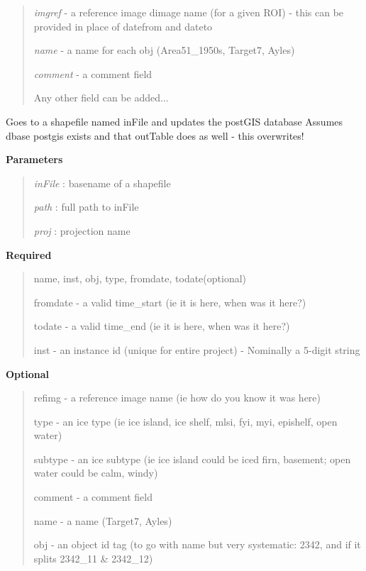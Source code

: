\documentclass[letterpaper,10pt,openany,oneside]{sphinxmanual}
\begin{document}
\begin{fulllineitems}
\begin{fulllineitems}
\begin{quote}
\emph{imgref}   - a reference image dimage name (for a given ROI) - this can be provided in place of datefrom and dateto

\emph{name}     - a name for each obj (Area51\_1950s, Target7, Ayles)

\emph{comment}  - a comment field

Any other field can be added...
\end{quote}

\end{fulllineitems}


\begin{fulllineitems}
\label{code:Database.Database.update_NTAI_FLUX_ROI}
Goes to a shapefile named inFile and updates the postGIS database
Assumes dbase postgis exists and that outTable does as well - this overwrites!

\textbf{Parameters}
\begin{quote}

\emph{inFile} : basename of a shapefile

\emph{path}   : full path to inFile

\emph{proj}   : projection name
\end{quote}

\textbf{Required}
\begin{quote}

name, inst, obj, type, fromdate, todate(optional)

fromdate - a valid time\_start (ie it is here, when was it here?)

todate   - a valid time\_end (ie it is here, when was it here?)

inst     - an instance id (unique for entire project) - Nominally a 5-digit string
\end{quote}

\textbf{Optional}
\begin{quote}

refimg   - a reference image name (ie how do you know it was here)

type     - an ice type (ie ice island, ice shelf, mlsi, fyi, myi, epishelf, open water)

subtype  - an ice subtype (ie ice island could be iced firn, basement; open water could be calm, windy)

comment  - a comment field

name     - a name (Target7, Ayles)

obj      - an object id tag (to go with name but very systematic: 2342, and if it splits 2342\_11 \& 2342\_12)
\end{quote}

\end{fulllineitems}


\end{fulllineitems}
\end{document}
